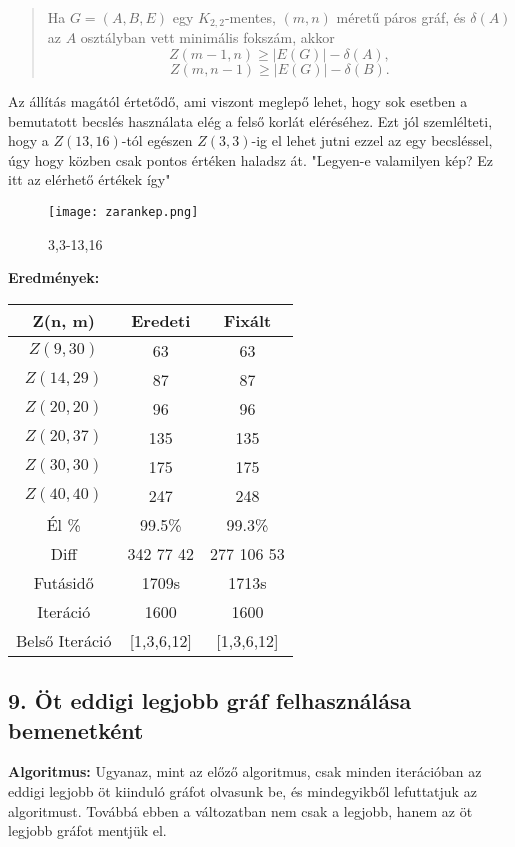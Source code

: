 \documentclass[12pt,a4paper]{article}
\begin{document}
\begin{quote}
Ha $G = (A, B, E)$ egy $K_{2,2}$-mentes, $(m,n)$ méretű páros gráf, és $\delta(A)$ az $A$ osztályban vett minimális fokszám, akkor
\[
Z(m-1, n) \geq |E(G)| - \delta(A),
\]
\[
Z(m, n-1) \geq |E(G)| - \delta(B).
\]
\end{quote}
Az állítás magától értetődő, ami viszont meglepő lehet, hogy sok esetben a bemutatott becslés használata elég a felső korlát eléréséhez. Ezt jól szemlélteti, hogy a $Z(13, 16)$-tól egészen $Z(3, 3)$-ig el lehet jutni ezzel az egy becsléssel, úgy hogy közben csak pontos értéken haladsz át. "Legyen-e valamilyen kép? Ez itt az elérhető értékek így"

\begin{figure}[H]
    \centering
    \texttt{[image: zarankep.png]}
    \caption{3,3-13,16}
    \label{fig:your_label}
\end{figure}

\textbf{Eredmények:}
\begin{table}[H]
\centering
\begin{tabular}{|c|c|c|}
\hline
\textbf{Z(n, m)} & \textbf{Eredeti} & \textbf{Fixált} \\
\hline
$Z(9,30)$  & 63 & 63 \\
$Z(14, 29)$ & 87 & 87 \\
$Z(20, 20)$ & 96 & 96 \\
$Z(20, 37)$ & 135 & 135 \\
$Z(30, 30)$ & 175 & 175 \\
$Z(40, 40)$ & 247 & 248 \\
\hline
Él \% & 99.5\% & 99.3\% \\
\hline
Diff & 342 77 42 & 277 106 53 \\
\hline
Futásidő & 1709s & 1713s \\
Iteráció & 1600 & 1600 \\
Belső Iteráció & [1,3,6,12] & [1,3,6,12] \\
\hline
\end{tabular}
\end{table}

\subsection*{9. Öt eddigi legjobb gráf felhasználása bemenetként}
\textbf{Algoritmus:} Ugyanaz, mint az előző algoritmus, csak minden iterációban az eddigi legjobb öt kiinduló gráfot olvasunk be, és mindegyikből lefuttatjuk az algoritmust. Továbbá ebben a változatban nem csak a legjobb, hanem az öt legjobb gráfot mentjük el.
\end{document}
